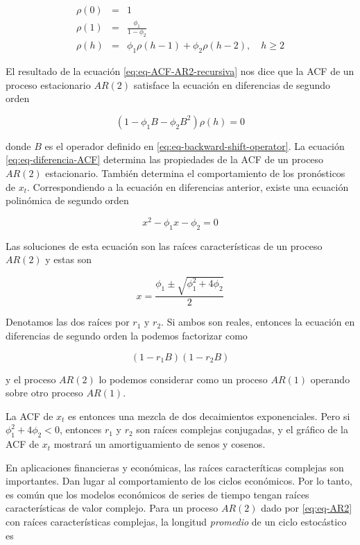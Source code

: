 \documentclass[12pt,]{krantz}
\theoremstyle{definition}
\theoremstyle{definition}
\theoremstyle{definition}
\theoremstyle{remark}
\begin{document}
\begin{eqnarray*}
\rho(0) &=& 1 \\
\rho(1) &=& \frac{\phi_1}{1-\phi_2} \\
\rho(h) &=& \phi_1\rho(h-1)+\phi_2\rho(h-2),\quad h\geq2
\end{eqnarray*}

El resultado de la ecuación \eqref{eq:eq-ACF-AR2-recursiva} nos dice que
la ACF de un proceso estacionario \(AR(2)\) satisface la ecuación en
diferencias de segundo orden

\begin{equation}
(1-\phi_1B-\phi_2B^2)\rho(h) = 0
\label{eq:eq-diferencia-ACF}
\end{equation}

donde \(B\) es el operador definido en
\eqref{eq:eq-backward-shift-operator}. La ecuación
\eqref{eq:eq-diferencia-ACF} determina las propiedades de la ACF de un
proceso \(AR(2)\) estacionario. También determina el comportamiento de
los pronósticos de \(x_t\). Correspondiendo a la ecuación en diferencias
anterior, existe una ecuación polinómica de segundo orden

\begin{equation}
x^2-\phi_1x-\phi_2=0
\label{eq:eq-polinomio-2do-orden-AR2}
\end{equation}

Las soluciones de esta ecuación son las raíces características de un
proceso \(AR(2)\) y estas son

\[x=\frac{\phi_1\pm\sqrt{\phi_1^2+4\phi_2}}{2}\]

Denotamos las dos raíces por \(r_1\) y \(r_2\). Si ambos son reales,
entonces la ecuación en diferencias de segundo orden la podemos
factorizar como

\[(1-r_1B)(1-r_2B)\]

y el proceso \(AR(2)\) lo podemos considerar como un proceso \(AR(1)\)
operando sobre otro proceso \(AR(1)\).

La ACF de \(x_t\) es entonces una mezcla de dos decaimientos
exponenciales. Pero si \(\phi_1^2+4\phi_2<0\), entonces \(r_1\) y
\(r_2\) son raíces complejas conjugadas, y el gráfico de la ACF de
\(x_t\) mostrará un amortiguamiento de senos y cosenos.

En aplicaciones financieras y económicas, las raíces caracteríticas
complejas son importantes. Dan lugar al comportamiento de los ciclos
económicos. Por lo tanto, es común que los modelos económicos de series
de tiempo tengan raíces características de valor complejo. Para un
proceso \(AR(2)\) dado por \eqref{eq:eq-AR2} con raíces características
complejas, la longitud \emph{promedio} de un ciclo estocástico es
\end{document}
